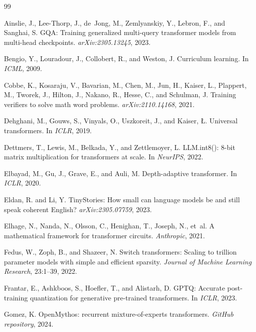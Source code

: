 \begin{thebibliography}{99}

Ainslie, J., Lee-Thorp, J., de~Jong, M., Zemlyanskiy, Y., Lebron, F.,
and Sanghai, S.
GQA: Training generalized multi-query transformer models from
multi-head checkpoints. \emph{arXiv:2305.13245}, 2023.

Bengio, Y., Louradour, J., Collobert, R., and Weston, J.
Curriculum learning. In \emph{ICML}, 2009.

Cobbe, K., Kosaraju, V., Bavarian, M., Chen, M., Jun, H., Kaiser, L.,
Plappert, M., Tworek, J., Hilton, J., Nakano, R., Hesse, C., and
Schulman, J.
Training verifiers to solve math word problems.
\emph{arXiv:2110.14168}, 2021.

Dehghani, M., Gouws, S., Vinyals, O., Uszkoreit, J., and Kaiser, {\L}.
Universal transformers. In \emph{ICLR}, 2019.

Dettmers, T., Lewis, M., Belkada, Y., and Zettlemoyer, L.
LLM.int8(): 8-bit matrix multiplication for transformers at scale.
In \emph{NeurIPS}, 2022.

Elbayad, M., Gu, J., Grave, E., and Auli, M.
Depth-adaptive transformer. In \emph{ICLR}, 2020.

Eldan, R. and Li, Y.
TinyStories: How small can language models be and still speak coherent English?
\emph{arXiv:2305.07759}, 2023.

Elhage, N., Nanda, N., Olsson, C., Henighan, T., Joseph, N., et~al.
A mathematical framework for transformer circuits.
\emph{Anthropic}, 2021.

Fedus, W., Zoph, B., and Shazeer, N.
Switch transformers: Scaling to trillion parameter models with simple and
efficient sparsity. \emph{Journal of Machine Learning Research}, 23:1--39, 2022.

Frantar, E., Ashkboos, S., Hoefler, T., and Alistarh, D.
GPTQ: Accurate post-training quantization for generative pre-trained
transformers. In \emph{ICLR}, 2023.

Gomez, K.
OpenMythos: recurrent mixture-of-experts transformers.
\emph{GitHub repository}, 2024.


\end{thebibliography}
